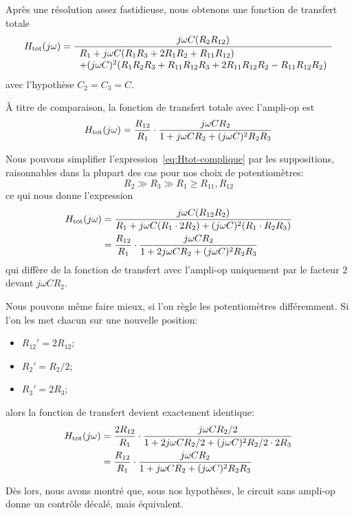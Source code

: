 Après une résolution assez fastidieuse, nous obtenons une fonction de transfert
totale
\begin{equation} \label{eq:Htot-complique}
    H_{\mathrm{tot}}(j\omega) = \frac{j\omega C(R_2R_{12})}
    {\begin{array}{l}
            R_1 + j\omega C(R_1R_3+2R_1R_2+R_{11}R_{12})\\
        + (j\omega C)^2(R_1R_2R_3 + R_{11}R_{12}R_3 + 2R_{11}R_{12}R_2
        - R_{11}R_{12}R_2)
\end{array}}
\end{equation}
avec l'hypothèse $C_2 = C_3 = C$.

À titre de comparaison, la fonction de transfert totale avec l'ampli-op est
\begin{equation}
    H_{\mathrm{tot}}(j\omega) = \frac{R_{12}}{R_1}\cdot
    \frac{j\omega CR_2}
    {1+j\omega CR_2 + (j\omega C)^2R_2R_3}
\end{equation}

Nous pouvons simplifier l'expression~\eqref{eq:Htot-complique}
par les suppositions, raisonnables dans la plupart des cas
pour nos choix de potentiomètres:
\begin{equation}
    R_2 \gg R_3 \gg R_1 \geq R_{11},R_{12}
\end{equation}
ce qui nous donne l'expression
\begin{equation}
    \begin{split}
        H_{\mathrm{tot}}(j\omega) &= \frac{j\omega C (R_{12} R_2)}
        {R_1 + j\omega C(R_1\cdot 2R_2) + (j\omega C)^2(R_1\cdot R_2R_3)} \\
        &= \frac{R_{12}}{R_1}\cdot
        \frac{j\omega C R_2}{1+2j\omega CR_2 + (j\omega C)^2R_2R_3}
    \end{split}
\end{equation}
qui diffère de la fonction de transfert avec l'ampli-op uniquement
par le facteur 2 devant $j\omega CR_2$.

Nous pouvons même faire mieux,
si l'on règle les potentiomètres différemment.
Si l'on les met chacun sur une nouvelle position:
\begin{itemize}
    \item $R_{12}' = 2R_{12}$;
    \item $R_2' = R_2/2$;
    \item $R_3' = 2R_3$;
\end{itemize}
alors la fonction de transfert devient exactement identique:
\begin{equation}
    \begin{split}
        H_{\mathrm{tot}}(j\omega) &= \frac{2R_{12}}{R_1} \cdot\frac{j\omega C R_2/2}
        {1+2j\omega CR_2/2 + (j\omega C)^2R_2/2\cdot 2R_3}\\
        &= \frac{R_{12}}{R_1}\cdot\frac{j\omega CR_2}
        {1+j\omega CR_2 + (j\omega C)^2R_2R_3}
    \end{split}
\end{equation}

Dès lors, nous avons montré que, sous nos hypothèses, le circuit sans ampli-op
donne un contrôle décalé, mais équivalent.
